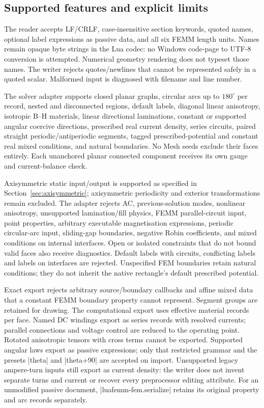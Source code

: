 \subsection{Supported features and explicit limits}

The reader accepts LF/CRLF, case-insensitive section keywords, quoted names,
optional label expressions as passive data, and all six FEMM length units.
Names remain opaque byte strings in the Lua codec: no Windows code-page to UTF-8
conversion is attempted. Numerical geometry rendering does not typeset those
names. The writer rejects quotes/newlines that cannot be represented safely in a
quoted scalar. Malformed input is diagnosed with filename and line number.

The solver adapter supports closed planar graphs, circular arcs up to $180^\circ$
per record, nested and disconnected regions, default labels, diagonal linear
anisotropy, isotropic B--H materials, linear directional laminations, constant
or supported angular coercive directions, prescribed real current density,
series circuits, paired straight periodic/antiperiodic segments,
tagged prescribed-potential and constant real mixed conditions, and natural
boundaries. No Mesh seeds exclude their faces entirely. Each
unanchored planar connected component receives its own gauge and current-balance check.

Axisymmetric static input/output is supported as specified in
Section~\ref{sec:axisymmetric}; axisymmetric periodicity and exterior
transformations remain excluded. The adapter rejects AC, previous-solution modes, nonlinear
anisotropy, unsupported lamination/fill physics, FEMM parallel-circuit input,
point properties, arbitrary executable magnetisation expressions, periodic
circular-arc input, sliding-gap boundaries, negative
Robin coefficients, and mixed conditions on internal interfaces. Open or isolated
constraints that do not bound valid faces also receive diagnostics. Default labels
with circuits, conflicting labels and labels on interfaces are rejected.
Unspecified FEM boundaries retain natural conditions; they do not inherit the
native rectangle's default prescribed potential.

Exact export rejects arbitrary source/boundary callbacks and affine mixed data
that a constant FEMM boundary property cannot represent. Segment groups are
retained for drawing. The computational export uses effective material records
per face. Named DC windings export as series records with resolved currents;
parallel connections and voltage control are reduced to the operating point.
Rotated anisotropic tensors with cross terms cannot be exported. Supported
angular laws export as passive expressions; only that restricted grammar and
the presets |theta| and |theta+90| are accepted on import. Unsupported legacy
ampere-turn inputs still export as current density: the writer does not invent
separate turns and current or recover every preprocessor editing attribute. For an unmodified passive document,
|luafemm-fem.serialize| retains its original property and arc records separately.

